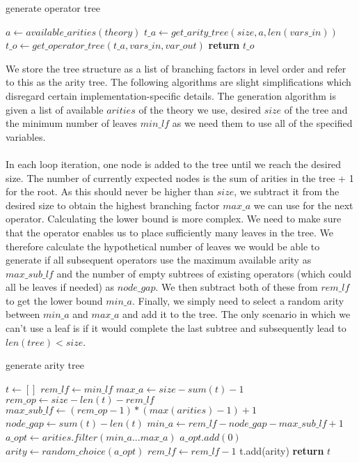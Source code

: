 \documentclass[sigplan,screen]{acmart}
\begin{document}
\begin{algorithm}[H]
\caption{generate operator tree}
\begin{algorithmic}
\State $a \gets available\_arities(theory)$
\State $t\_a \gets get\_arity\_tree(size, a, len(vars\_in))$
\State $t\_o \gets get\_operator\_tree(t\_a, vars\_in, var\_out)$
\State \textbf{return} $t\_o$
\end{algorithmic}
\end{algorithm}
We store the tree structure as a list of branching factors in level order and refer to this as the arity tree. The following algorithms are slight simplifications which disregard certain implementation-specific details. The generation algorithm is given a list of available $arities$ of the theory we use, desired $size$ of the tree and the minimum number of leaves $min\_lf$ as we need them to use all of the specified variables.
\\ \\
In each loop iteration, one node is added to the tree until we reach the desired size. The number of currently expected nodes is the sum of arities in the tree + 1 for the root. As this should never be higher than $size$, we subtract it from the desired size to obtain the highest branching factor $max\_a$ we can use for the next operator. Calculating the lower bound is more complex. We need to make sure that the operator enables us to place sufficiently many leaves in the tree. We therefore calculate the hypothetical number of leaves we would be able to generate if all subsequent operators use the maximum available arity as $max\_sub\_lf$ and the number of empty subtrees of existing operators (which could all be leaves if needed) as $node\_gap$. We then subtract both of these from $rem\_lf$ to get the lower bound $min\_a$. Finally, we simply need to select a random arity between $min\_a$ and $max\_a$ and add it to the tree. The only scenario in which we can't use a leaf is if it would complete the last subtree and subsequently lead to $len(tree) < size$.
\begin{algorithm}[H]
\caption{generate arity tree}
\label{alg:aritytree}
\begin{algorithmic}
\State $t \gets []$
\State $rem\_lf \gets min\_lf$
    \State $max\_a \gets size - sum(t) - 1$
    \State $rem\_op \gets size - len(t) - rem\_lf$
    \State $max\_sub\_lf \gets (rem\_op - 1) * (max(arities) - 1) + 1$
     \State $node\_gap \gets sum(t) - len(t)$
    \State $min\_a \gets rem\_lf - node\_gap - max\_sub\_lf + 1$
    \State $a\_opt \gets arities.filter(min\_a...max\_a)$
        \State $a\_opt.add(0)$
    \EndIf
    \State $arity \gets random\_choice(a\_opt)$
        \State $rem\_lf \gets rem\_lf - 1$
    \EndIf
    \State t.add(arity)
\EndWhile
\State \textbf{return} $t$

\end{algorithmic}
\end{algorithm}
\end{document}
